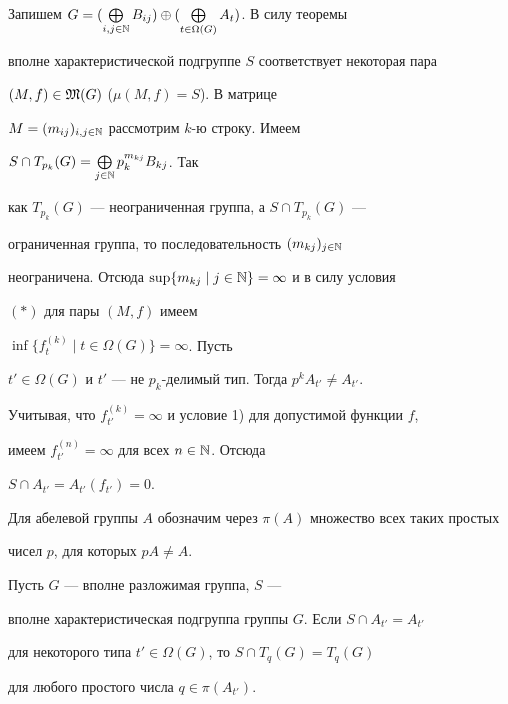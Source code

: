 \begin{pf}


Запишем $G=(\bigoplus\limits_{i,j\in\Bbb N}B_{ij})


\oplus(\bigoplus\limits_{t\in\Omega(G)}A_t)$. В силу теоремы


вполне характеристической подгруппе $S$ соответствует некоторая пара


$(M, f)\in\frak M(G)$ ($\mu(M, f)=S$). В матрице


$M=(m_{ij})_{i,j\in\Bbb N}$ рассмотрим $k$-ю строку. Имеем


$S\cap T_{p_k}(G)=\bigoplus\limits_{j\in\Bbb N}p_k^{m_{kj}}B_{kj}$. Так


как $T_{p_k}(G)$ --- неограниченная группа, а $S\cap T_{p_k}(G)$ ---


ограниченная группа, то последовательность $(m_{kj})_{j\in\Bbb N}$


неограничена. Отсюда $\sup\{m_{kj}\mid j\in\Bbb N\}=\infty$ и в силу условия


$(\ast)$ для пары $(M, f)$ имеем


$\inf\{f_t^{(k)}\mid t\in\Omega(G)\}=\infty$. Пусть


$t'\in\Omega(G)$ и $t'$ --- не $p_k$-делимый тип. Тогда $p^kA_{t'}\ne A_{t'}$.


Учитывая, что $f_{t'}^{(k)}=\infty$ и условие 1) для допустимой функции $f$,


имеем $f_{t'}^{(n)}=\infty$ для всех $n\in\Bbb N$. Отсюда


$S\cap A_{t'}=A_{t'}(f_{t'})=0$.


\end{pf}





Для абелевой группы $A$ обозначим через $\pi(A)$ множество всех таких простых


чисел $p$, для которых $pA\ne A$.





\begin{cor}


Пусть $G$ --- вполне разложимая группа, $S$ ---


вполне характеристическая подгруппа группы $G$. Если $S\cap A_{t'}=A_{t'}$


для некоторого типа $t'\in\Omega(G)$, то $S\cap T_q(G)=T_q(G)$


 для любого простого числа $q\in\pi(A_{t'})$.


\end{cor}





